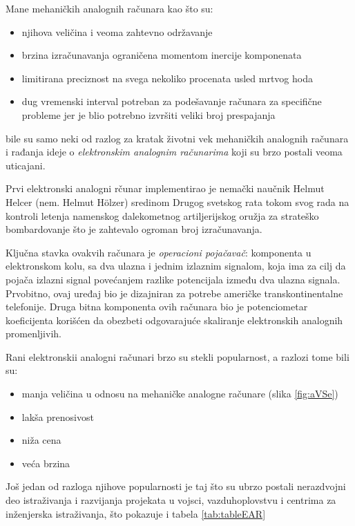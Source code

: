 \documentclass[a4paper]{article}
\begin{document}
{		\par Mane mehaničkih analognih računara kao što su:
		\begin{itemize}
			\item njihova veličina i veoma zahtevno održavanje
			\item brzina izračunavanja ograničena momentom inercije komponenata
			\item limitirana preciznost na svega nekoliko procenata usled mrtvog hoda
			\item dug vremenski interval potreban za podešavanje računara za specifične probleme jer je blio potrebno izvršiti veliki broj prespajanja
		\end{itemize}
		bile su samo neki od razlog za kratak životni vek mehaničkih analognih računara i rađanja ideje o \emph{elektronskim analognim računarima} koji su brzo postali veoma uticajani.
		
		\bigskip
		
		\par Prvi elektronski analogni rčunar implementirao je nemački naučnik Helmut Helcer (nem. Helmut Hölzer) sredinom Drugog svetskog rata tokom svog rada na kontroli letenja namenskog dalekometnog artiljerijskog oružja za strateško bombardovanje što je zahtevalo ogroman broj izračunavanja. \cite{Holzer}
		
		\bigskip
		
		\par Ključna stavka ovakvih računara je \emph{operacioni pojačavač}: komponenta u elektronskom kolu, sa dva ulazna i jednim izlaznim signalom, koja ima za cilj da pojača izlazni signal povećanjem razlike potencijala između dva ulazna signala. Prvobitno, ovaj uređaj bio je dizajniran za potrebe američke transkontinentalne telefonije. Druga bitna komponenta ovih računara bio je potenciometar koeficijenta korišćen da obezbeti odgovarajuće skaliranje elektronskih analognih promenljivih.
		
		\bigskip
		
		\par Rani elektronskii analogni računari brzo su stekli popularnost, a razlozi tome bili su:
		\begin{itemize}
			\item manja veličina u odnosu na mehaničke analogne računare (slika \ref{fig:aVSe})
			\item lakša prenosivost
			\item niža cena
			\item  veća brzina
		\end{itemize}
		Još jedan od razloga njihove popularnosti je taj što su ubrzo postali nerazdvojni deo istraživanja i razvijanja projekata u vojsci, vazduhoplovstvu i centrima za inženjerska istraživanja, što pokazuje i tabela \ref{tab:tableEAR} \cite{table}
		
}
\end{document}
